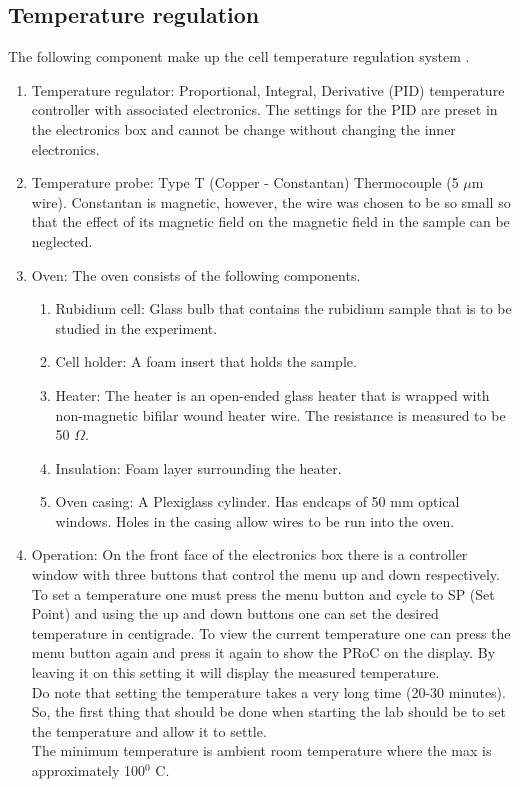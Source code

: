\documentclass[twocolumn]{article}
\begin{document}
\subsection{Temperature regulation}
The following component make up the cell temperature regulation system 
\cite{ref:3}.
\begin{enumerate}[label=\alph*).]
\item Temperature regulator: Proportional, Integral, Derivative (PID) 
temperature controller with associated electronics. The settings for the PID 
are preset in the electronics box and cannot be change without changing the 
inner electronics.
\item Temperature probe: Type T (Copper - Constantan) Thermocouple (5 $\mu$m 
wire). Constantan is magnetic, however, the wire was chosen to be so small so 
that the effect of its magnetic field on the magnetic field in the sample can 
be neglected.
\item Oven: The oven consists of the following components.
\begin{enumerate}[label=\arabic*).]
\item Rubidium cell: Glass bulb that contains the rubidium sample that is to be 
studied in the experiment.
\item Cell holder: A foam insert that holds the sample.
\item Heater: The heater is an open-ended glass heater that is wrapped with 
non-magnetic bifilar wound heater wire. The resistance is measured to be 50 
$\Omega$.
\item Insulation: Foam layer surrounding the heater.
\item Oven casing: A Plexiglass cylinder. Has endcaps of 50 mm optical windows. 
Holes in the casing allow wires to be run into the oven.
\end{enumerate}
\item Operation: On the front face of the electronics box there is a controller 
window with three buttons that control the menu up and down respectively. To 
set a temperature one must press the menu button and cycle to SP (Set Point) 
and using the up and down buttons one can set the desired temperature in 
centigrade. To view the current temperature one can press the menu button again 
and press it again to show the PRoC on the display. By leaving it on this 
setting it will display the measured temperature.
\\
Do note that setting the temperature takes a very long time (20-30 minutes). 
So, the first thing that should be done when starting the lab should be to set 
the temperature and allow it to settle.
\\
The minimum temperature is ambient room temperature where the max is 
approximately 100$^0$ C.
\end{enumerate}
\end{document}
